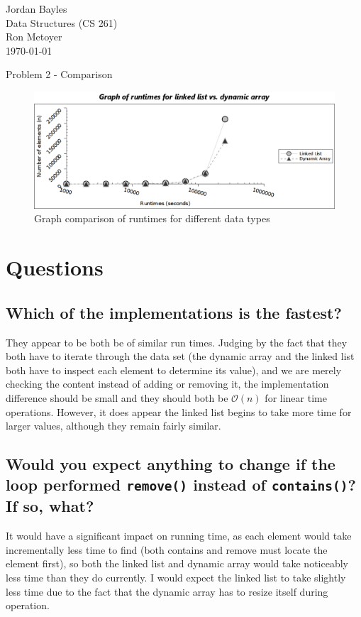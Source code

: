 \documentclass[12pt,letterpaper]{article}
\author{Jordan Bayles}
\begin{document}

\begin{flushright}
Jordan Bayles\\
Data Structures (CS 261)\\
Ron Metoyer\\
\today
\end{flushright}

\begin{center}
Problem 2 - Comparison
\end{center}

\begin{figure}[H]
    \centering
    \includegraphics[width=6in]{graph.png}
    \caption{Graph comparison of runtimes for different data types}
\end{figure}

\section{Questions}
\subsection{ Which of the implementations is the fastest? }
They appear to be both be of similar run times. Judging by the
fact that they both have to iterate through the data set
(the dynamic array and the linked list both have to inspect each
element to determine its value), and we are merely checking the
content instead of adding or removing it, the implementation
difference should be small and they should both be $\mathcal{O}(n)$
for linear time operations. However, it does appear the linked list
begins to take more time for larger values, although they remain
fairly similar.

\subsection{ Would you expect anything to change if the loop performed
\texttt{remove()} instead of \texttt{contains()}? If so, what? }
It would have a significant impact on running time, as each element
would take incrementally less time to find (both contains and remove
must locate the element first), so both the linked list and
dynamic array would take noticeably less time than they do currently.
I would expect the linked list to take slightly less time due to the fact that
the dynamic array has to resize itself during operation.
\end{document}
